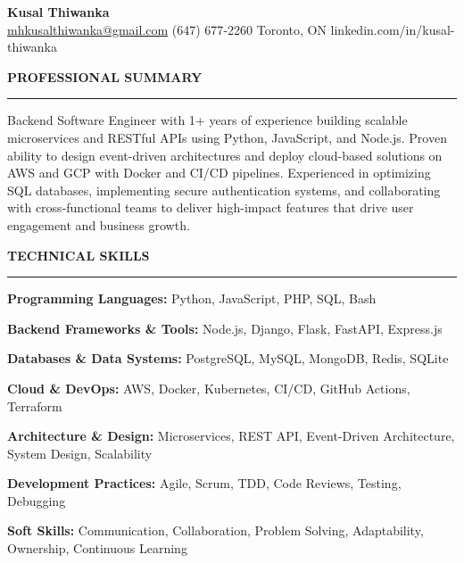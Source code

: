 \documentclass[10pt,letterpaper]{article}
\begin{document}
\begin{center}
{\LARGE\textbf{Kusal Thiwanka}}\\[3pt]
\href{mailto:mhkusalthiwanka@gmail.com}{mhkusalthiwanka@gmail.com}\hspace{2em}%
(647) 677{-}2260\hspace{2em}%
Toronto, ON\hspace{2em}
linkedin.com/in/kusal-thiwanka
\end{center}

\vspace{6pt}

\textbf{PROFESSIONAL SUMMARY}\\[-8pt]
\noindent\rule{\textwidth}{1pt}

\vspace{-2pt}

Backend Software Engineer with 1+ years of experience building scalable microservices and RESTful APIs using Python, JavaScript, and Node.js. Proven ability to design event-driven architectures and deploy cloud-based solutions on AWS and GCP with Docker and CI/CD pipelines. Experienced in optimizing SQL databases, implementing secure authentication systems, and collaborating with cross-functional teams to deliver high-impact features that drive user engagement and business growth.

\vspace{8pt}

\textbf{TECHNICAL SKILLS}\\[-8pt]
\noindent\rule{\textwidth}{1pt}

\vspace{-2pt}

\textbf{Programming Languages:} Python, JavaScript, PHP, SQL, Bash

\textbf{Backend Frameworks \& Tools:} Node.js, Django, Flask, FastAPI, Express.js

\textbf{Databases \& Data Systems:} PostgreSQL, MySQL, MongoDB, Redis, SQLite

\textbf{Cloud \& DevOps:} AWS, Docker, Kubernetes, CI/CD, GitHub Actions, Terraform

\textbf{Architecture \& Design:} Microservices, REST API, Event-Driven Architecture, System Design, Scalability

\textbf{Development Practices:} Agile, Scrum, TDD, Code Reviews, Testing, Debugging

\textbf{Soft Skills:} Communication, Collaboration, Problem Solving, Adaptability, Ownership, Continuous Learning
\end{document}
